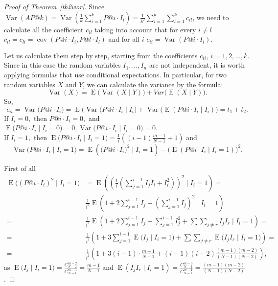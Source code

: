 \documentclass[10pt,a4paper]{amsart}
\begin{document}
\begin{proof}[Proof of Theorem~\ref {th2wor}]
Since $\operatorname{Var}(AP@k) = \operatorname{Var}\left(\frac{1}{k} \sum_{i=1}^k P@i \cdot I_i\right) = \frac{1}{k^2} \sum_{i=1}^k \sum_{l=1}^k c_{il}$, we need to calculate  all  the coefficient $c_{il}$ taking into account that
 for every $i\neq l$
$c_{il} = c_{li} = \operatorname{cov}(P@i \cdot I_i, P@l \cdot I_l)$
and  for all $i$
$c_{ii} = \operatorname{Var}(P@i \cdot I_i)$.

Let us calculate them step by step, starting from the coefficients $c_{ii}$, $i=1,2,...,k.$ Since in this case the random variables $I_1,..., I_n$ are not independent, it is worth applying formulas that use conditional expectations. In particular, for two random variables $X$ and $Y$, we can calculate the variance by the formula:
$$\operatorname{Var}(X)=\operatorname{E}\big(\operatorname{Var}(X\mid Y)\big)+Var\big(\operatorname{E}(X\mid Y)\big).$$
So,
\begin{equation}\label{t1t2}
c_{ii}=\operatorname{Var}\big(P@i\cdot I_i\big)=\operatorname{E}\big(\operatorname{Var}(P@i\cdot I_i\mid I_i\big)+\operatorname{Var} \big(\operatorname{E}(P@i\cdot I_i\mid I_i) \big)=t_1+t_2.
\end{equation}
If $I_i=0,$ then $P@i\cdot I_i=0,$ and $\operatorname{E}\big(P@i\cdot I_i\mid I_i=0\big)=0, \operatorname{Var}\big(P@i\cdot I_i\mid I_i=0\big)=0.$ \\
If $I_i=1,$ then $\operatorname{E}\big(P@i\cdot I_i\mid I_i=1\big)=\frac{1}{i} \left((i-1)\frac{m-1}{N-1}+1 \right)$ and 
$$\operatorname{Var}\big(P@i\cdot I_i\mid I_i=1\big)=\operatorname{E}\left(\big(P@i\cdot I_i\big)^2\mid I_i=1\right)-\big(\operatorname{E}(P@i\cdot I_i\mid I_i=1)\big)^2.$$

First of all
\begin{equation*}
\begin{split}
\operatorname{E}\big((P@i\cdot I_i)^2\mid I_i=1\big)&=\operatorname{E}\left(\left(\frac{1}{i}\left(\sum_{j=1}^{i-1} I_jI_i+I_i^2\right)\right)^2\mid I_i=1\right)=\\
=&\frac{1}{i^2}\operatorname{E}\left(1+2\sum_{j=1}^{i-1} I_j
+\left(\sum_{j=1}^{i-1} I_j\right)^2\mid I_i=1\right)=\\
=&\frac{1}{i^2}\operatorname{E}\left(1+2\sum_{j=1}^{i-1} I_j
+\sum_{j=1}^{i-1} I_j^2+\sum \sum_{j\neq r}I_j I_r\mid I_i=1\right)=\\
=&\frac{1}{i^2}\left(1+3\sum_{j=1}^{i-1} \operatorname{E}\big(I_j \mid I_i=1\big)+
\sum \sum_{j\neq r}\operatorname{E}\big(I_j I_r\mid I_i=1\big)\right)=\\
=&\frac{1}{i^2}\left(1+3(i-1)\cdot \frac{m-1}{N-1}+
(i-1)(i-2)\frac{(m-1)(m-2)}{(N-1)(N-2)}\right),
\end{split}
\end{equation*}
as $\operatorname{E}\big(I_j\mid I_i=1\big)=\frac{C_{N-2}^{m-2}}{C_{N-1}^{m-1}}=\frac{m-1}{N-1}$ and $\operatorname{E}(I_j I_r \mid I_i=1)=\frac{C_{N-3}^{m-3}}{C_{N-1}^{m-1}}=\frac{(m-1)(m-2)}{(N-1)(N-2)}$.


\end{proof}
\end{document}
